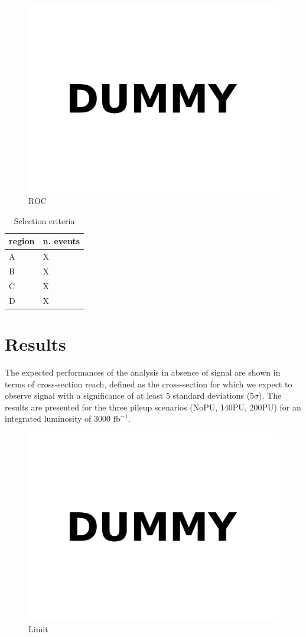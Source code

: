 \documentclass[11pt,twoside,a4paper]{article}
\begin{document}
\begin{figure}
\centering
\includegraphics[width=.5\textwidth]{figures/dummy.pdf}
\caption{ROC\label{fig:roc}}
\end{figure}

\begin{table}
 \centering
 \caption{Selection criteria\label{tab:numbers}}
 \begin{tabular}{ll}
  \toprule
  region 	& n. events \\
  \midrule
  A		& X \\
  B		& X \\
  C		& X \\
  D		& X \\
  \bottomrule
 \end{tabular}
\end{table}

\section{Results}

The expected performances of the analysis in absence of signal are shown in terms of cross-section reach, defined as the cross-section for which we expect to observe signal with a significance of at least 5 standard deviations (5$\sigma$).
The results are presented for the three pileup scenarios (NoPU, 140PU, 200PU) for an integrated luminosity of 3000 $\mathrm{fb}^{-1}$.

\begin{figure}
\centering
\includegraphics[width=.5\textwidth]{figures/dummy.pdf}
\caption{Limit\label{fig:limit}}
\end{figure}
\end{document}
